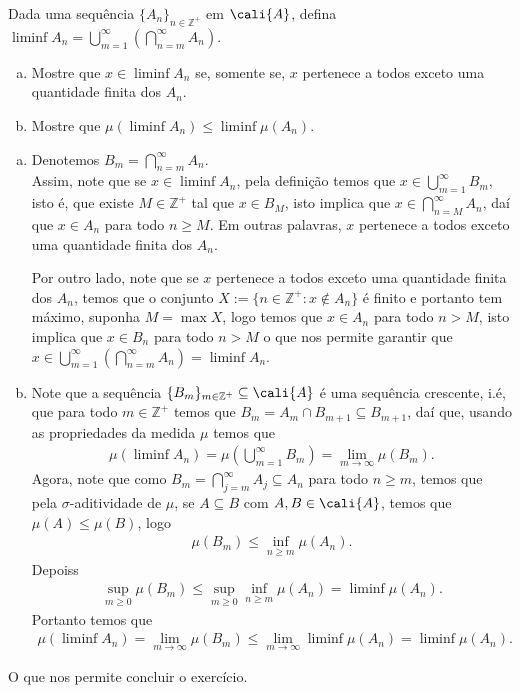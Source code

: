 \begin{homeworkProblem}[5]
  Dada uma sequência $\{A_n\}_{n\in\mathbb{Z}^{+}}$ em $\cali{A}$, defina $\liminf A_n=\bigcup_{m=1}^{\infty}\left( \bigcap_{n=m}^{\infty} A_n \right)$.
  \begin{enumerate}[a)]
    \item Mostre que $x\in \liminf A_n$ se, somente se, $x$ pertenece a todos exceto uma quantidade finita dos $A_n$.
    \item Mostre que $\mu(\liminf A_n)\leq\liminf\mu(A_n)$.
  \end{enumerate}
  \begin{solution}
    \begin{enumerate}[a)]
      \item Denotemos $B_m=\bigcap_{n=m}^{\infty}A_n$.\\
        
        Assim, note que se $x\in\liminf A_n$, pela definição temos que $x\in\bigcup_{m=1}^{\infty}B_m$, isto é, que existe $M\in\mathbb{Z}^{+}$ tal que $x\in B_M$, isto implica que $x\in\bigcap_{n=M}^{\infty}A_n$, daí que $x\in A_n$ para todo $n\geq M$. Em outras palavras, $x$ pertenece a todos exceto uma quantidade finita dos $A_n$.

        Por outro lado, note que se $x$ pertenece a todos exceto uma quantidade finita dos $A_n$, temos que o conjunto $X:=\{n\in\mathbb{Z}^{+}:x\notin A_n\}$ é finito e portanto tem máximo, suponha $M=\max X$, logo temos que $x\in A_{n}$ para todo $n>M$, isto implica que $x\in B_n$ para todo $n>M$ o que nos permite garantir que $x\in\bigcup_{m=1}^{\infty}\left( \bigcap_{n=m}^{\infty}A_n \right)=\liminf A_n$.
      \item Note que a sequência $\{B_m\}_{m\in\mathbb{Z}^{+}}\subseteq\cali{A}$ é uma sequência crescente, i.é, que para todo $m\in\mathbb{Z}^{+}$ temos que $B_m=A_m\cap B_{m+1}\subseteq B_{m+1}$, daí que, usando as propriedades da medida $\mu$ temos que 
        \begin{align*}
          \mu\left( \liminf A_n \right)=\mu\left(\bigcup_{m=1}^{\infty}B_m \right)=\lim_{m\to\infty}\mu(B_m).
        \end{align*}
        Agora, note que como $B_m=\bigcap_{j=m}^{\infty}A_j\subseteq A_n$ para todo $n\geq m$, temos que pela $\sigma$-aditividade de $\mu$, se $A\subseteq B$ com $A,B\in\cali{A}$, temos que $\mu(A)\leq \mu(B)$, logo 
        \begin{align*}
          \mu(B_m)\leq\inf_{n\geq m}\mu(A_n).
        \end{align*}
        Depoiss
        \begin{align*}
          \sup_{m\geq 0}\mu(B_m)\leq\sup_{m\geq 0}\inf_{n\geq m}\mu(A_n)=\liminf \mu(A_n).
        \end{align*}
        Portanto temos que
        \begin{align*}
          \mu\left( \liminf A_n \right)=\lim_{m\to\infty}\mu(B_m)\leq\lim_{m\to\infty}\liminf \mu(A_n)=\liminf\mu(A_n).
        \end{align*}
    \end{enumerate}
    O que nos permite concluir o exercício.
  \end{solution}
\end{homeworkProblem}
